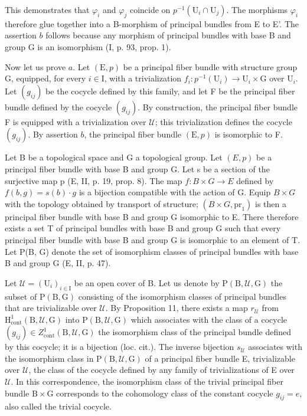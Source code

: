 This demonstrates that \(\varphi_{i}\) and \(\varphi_{j}\) coincide on \(p^{-1}(\mathrm{U}_{i}\cap\mathrm{U}_{j})\). The morphisms \(\varphi_{i}\) therefore glue together into a B-morphism of principal bundles from E to E'. The assertion \(b\) follows because any morphism of principal bundles with base B and group G is an isomorphism (I, p. 93, prop. 1).

Now let us prove \(a\). Let \((\mathrm{E}, p)\) be a principal fiber bundle with structure group G, equipped, for every \(i \in \mathrm{I}\), with a trivialization \(f_i: p^{-1}(\mathrm{U}_i) \to \mathrm{U}_i \times \mathrm{G}\) over \(\mathrm{U}_i\). Let \((g_{ij})\) be the cocycle defined by this family, and let F be the principal fiber bundle defined by the cocycle \((g_{ij})\). By construction, the principal fiber bundle F is equipped with a trivialization over \(\mathcal{U}\); this trivialization defines the cocycle \((g_{ij})\). By assertion \(b\), the principal fiber bundle \((\mathrm{E}, p)\) is isomorphic to F.

Let B be a topological space and G a topological group. Let \((E,p)\) be a principal fiber bundle with base B and group G. Let s be a section of the surjective map p (E, II, p. 19, prop. 8). The map \(f\colon B\times G\to E\) defined by \(f(b,g)=s(b)\cdot g\) is a bijection compatible with the action of G. Equip \(B\times G\) with the topology obtained by transport of structure; \((B\times G,\mathrm{pr}_{1})\) is then a principal fiber bundle with base B and group G isomorphic to E. There therefore exists a set T of principal bundles with base B and group G such that every principal fiber bundle with base B and group G is isomorphic to an element of T. Let P(B, G) denote the set of isomorphism classes of principal bundles with base B and group G (E, II, p. 47).

Let \(\mathcal{U} = (\mathrm{U}_i)_{i\in \mathrm{I}}\) be an open cover of B. Let us denote by \(\mathrm{P(B,\mathcal{U},G)}\) the subset of \(\mathrm{P(B,G)}\) consisting of the isomorphism classes of principal bundles that are trivializable over \(\mathcal{U}\). By Proposition 11, there exists a map \(r_{\mathcal{U}}\) from \(\mathrm{H}_{\mathrm{cont}}^{1}(\mathrm{B},\mathcal{U},\mathrm{G})\) into \(\mathrm{P(B,\mathcal{U},G)}\) which associates with the class of a cocycle \((g_{ij})\in Z_{\mathrm{cont}}^{1}(\mathrm{B},\mathcal{U},\mathrm{G})\) the isomorphism class of the principal bundle defined by this cocycle; it is a bijection (loc. cit.). The inverse bijection \(s_{\mathcal{U}}\) associates with the isomorphism class in \(\mathrm{P(B,\mathcal{U},G)}\) of a principal fiber bundle E, trivializable over \(\mathcal{U}\), the class of the cocycle defined by any family of trivializations of E over \(\mathcal{U}\). In this correspondence, the isomorphism class of the trivial principal fiber bundle \(\mathrm{B}\times \mathrm{G}\) corresponds to the cohomology class of the constant cocycle \(g_{ij} = e\), also called the trivial cocycle.

